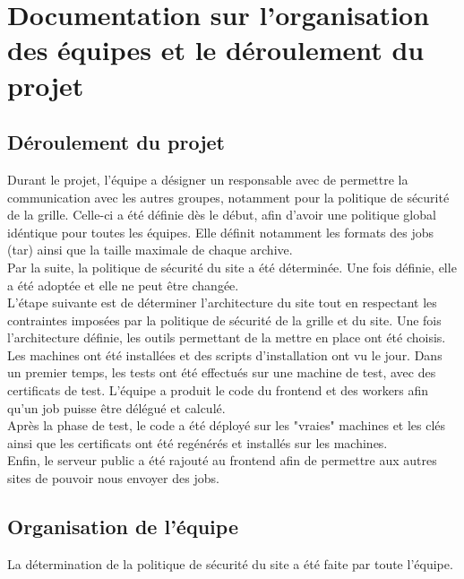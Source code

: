 \newpage

\chapter{Documentation sur l'organisation des équipes et le déroulement du projet}

\section{Déroulement du projet}

Durant le projet, l'équipe a désigner un responsable avec de permettre la communication avec les autres groupes, notamment pour la politique de sécurité de la grille. Celle-ci a été définie dès le début, afin d'avoir une politique global idéntique pour toutes les équipes. Elle définit notamment les formats des jobs (tar) ainsi que la taille maximale de chaque archive. \\

Par la suite, la politique de sécurité du site a été déterminée. Une fois définie, elle a été adoptée et elle ne peut être changée. \\

L'étape suivante est de déterminer l'architecture du site tout en respectant les contraintes imposées par la politique de sécurité de la grille et du site. Une fois l'architecture définie, les outils permettant de la mettre en place ont été choisis. \\

Les machines ont été installées et des scripts d'installation ont vu le jour. Dans un premier temps, les tests ont été effectués sur une machine de test, avec des certificats de test. L'équipe a produit le code du frontend et des workers afin qu'un job puisse être délégué et calculé. \\

Après la phase de test, le code a été déployé sur les "vraies" machines et les clés ainsi que les certificats ont été regénérés et installés sur les machines. \\

Enfin, le serveur public a été rajouté au frontend afin de permettre aux autres sites de pouvoir nous envoyer des jobs.

\section{Organisation de l'équipe}

La détermination de la politique de sécurité du site a été faite par toute l'équipe. \\

